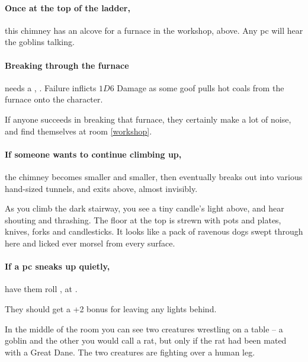 \begin{multicols}{2}
\paragraph{Once at the top of the ladder,}
this chimney has an alcove for a furnace in the workshop, above.
Any \gls{pc} will hear the goblins talking.

\paragraph{Breaking through the furnace}
needs a , \tn[6].
Failure inflicts $1D6$ Damage as some goof pulls hot coals from the furnace onto the character.

If anyone succeeds in breaking that furnace, they certainly make a lot of noise, and find themselves at room \ref{workshop}.

\paragraph{If someone wants to continue climbing up,}
the chimney becomes smaller and smaller, then eventually breaks out into various hand-sized tunnels, and exits above, almost invisibly.


\begin{boxtext}

  As you climb the dark stairway, you see a tiny candle's light above, and hear shouting and thrashing.
  The floor at the top is strewn with pots and plates, knives, forks and candlesticks.
  It looks like a pack of ravenous dogs swept through here and licked ever morsel from every surface.

\end{boxtext}

\paragraph{If a \gls{pc} sneaks up quietly,}
have them roll ,  at \tn[9].

They should get a +2 bonus for leaving any lights behind.

\begin{boxtext}

  In the middle of the room you can see two creatures wrestling on a table -- a goblin and the other you would call a rat, but only if the rat had been mated with a Great Dane.
  The two creatures are fighting over a human leg.


\end{boxtext}
\end{multicols}
